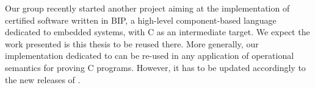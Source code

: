 

Our group recently started another project aiming at
the implementation of certified software written in BIP,
a high-level component-based language dedicated to embedded systems,
with \compcert C as an intermediate target.
We expect the work presented is this thesis to be reused there.
More generally,
our implementation \hcinv dedicated to \compcert
can be re-used in any application of \compcert operational semantics
for proving C programs.
However, it has to be updated accordingly to the new releases of \compcert.





